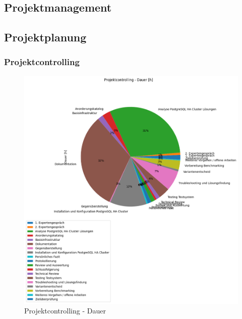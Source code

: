 
\begin{flushleft}
\clearpage
{}
\recalctypearea
\pagestyle{headings}
    \chapter{Projektmanagement}
    \section{Projektplanung}
    \subsection{Projektcontrolling}
    
\end{flushleft}
\clearpage
{}
\recalctypearea
\begin{flushleft}
\pagestyle{headings}
    \begin{figure}[H]
        \centering
        \includegraphics[width=0.75\linewidth]{source/pandas_data_chart_plotter/projektcontrolling_dauer}
        \caption{Projektcontrolling - Dauer}
        \label{fig:projektcontrolling_dauer}
    \end{figure}
\end{flushleft}
